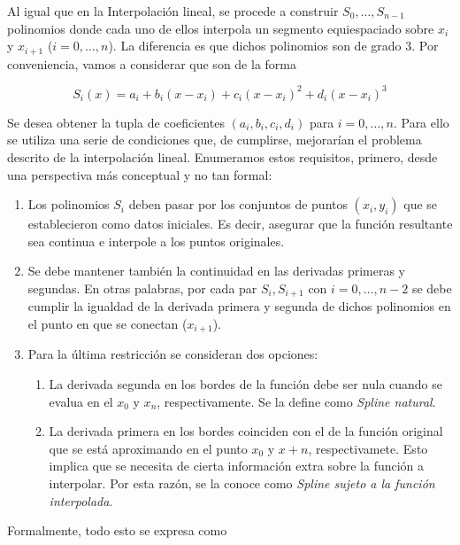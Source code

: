 Al igual que en la Interpolaci\'on lineal, se procede a construir $S_0, \ldots, S_{n - 1}$ polinomios donde cada uno de ellos interpola un segmento equiespaciado sobre $x_i$ y $x_{i + 1}$ ($i = 0, \ldots, n$). La diferencia es que dichos polinomios son de grado 3. Por conveniencia, vamos a considerar que son de la forma

\[S_i(x) = a_i + b_i (x - x_i) + c_i (x - x_i)^2 + d_i (x - x_i)^3\]

Se desea obtener la tupla de coeficientes $(a_i,b_i,c_i,d_i)$ para $i = 0, \ldots, n$. Para ello se utiliza una serie de condiciones que, de cumplirse, mejorarían el problema descrito de la interpolación lineal. Enumeramos estos requisitos, primero, desde una perspectiva m\'as conceptual y no tan formal:

\begin{enumerate}
	\item Los polinomios $S_i$ deben pasar por los conjuntos de puntos $(x_i,y_i)$ que se establecieron como datos iniciales. Es decir, asegurar que la funci\'on resultante sea continua e interpole a los puntos originales.
	\item Se debe mantener tambi\'en la continuidad en las derivadas primeras y segundas. En otras palabras, por cada par $S_i, S_{i + 1}$ con $i = 0, \ldots, n-2$ se debe cumplir la igualdad de la derivada primera y segunda de dichos polinomios en el punto en que se conectan ($x_{i + 1}$).
	\item Para la \'ultima restricci\'on se consideran dos opciones:
		\begin{enumerate}
			\item La derivada segunda en los bordes de la funci\'on debe ser nula cuando se evalua en el $x_0$ y $x_n$, respectivamente. Se la define como \textit{Spline natural}.
			\item La derivada primera en los bordes coinciden con el de la funci\'on original que se est\'a aproximando en el punto $x_0$ y $x+n$, respectivamete. Esto implica que se necesita de cierta informaci\'on extra sobre la funci\'on a interpolar. Por esta raz\'on, se la conoce como \textit{Spline sujeto a la funci\'on interpolada}.  
		\end{enumerate}
\end{enumerate}

Formalmente, todo esto se expresa como~\cite{tagliavini}

